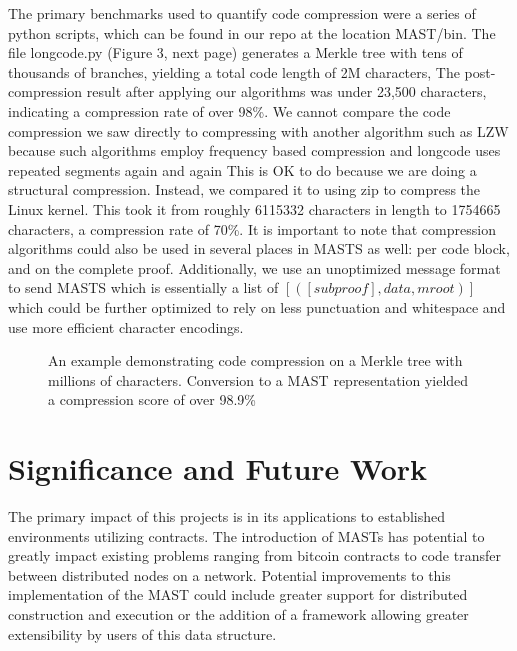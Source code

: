 \documentclass{vldb}
\begin{document}
The primary benchmarks used to quantify code compression were a series of python scripts, which can be found in our repo at the location MAST/bin. The file longcode.py (Figure 3, next page) generates a Merkle tree with tens of thousands of branches, yielding a total code length of 2M characters, The post-compression result after applying our algorithms was under 23,500 characters, indicating a compression rate of over 98\%. We cannot compare the code compression we saw directly to compressing with another algorithm such as LZW because such algorithms employ frequency based compression and longcode uses repeated segments again and again This is OK to do because we are doing a structural compression. Instead, we compared it to using zip to compress the Linux kernel. This took it from roughly 6115332 characters in length to 1754665 characters, a compression rate of 70\%. It is important to note that compression algorithms could also be used in several places in MASTS as well: per code block, and on the complete proof. Additionally, we use an unoptimized message format to send MASTS which is essentially a list of $[([subproof],data, mroot) ]$ which could be further optimized to rely on less punctuation and whitespace and use more efficient character encodings.

\begin{figure}[t!]
	
	\caption{An example demonstrating code compression on a Merkle tree with millions of characters. Conversion to a MAST representation yielded a compression score of over 98.9\%}
\end{figure}

\section{Significance and Future Work}

The primary impact of this projects is in its applications to established environments utilizing contracts. The introduction of MASTs has potential to greatly impact existing problems ranging from bitcoin contracts to code transfer between distributed nodes on a network. Potential improvements to this implementation of the MAST could include greater support for distributed construction and execution or the addition of a framework allowing greater extensibility by users of this data structure.

\pagebreak



\end{document}

